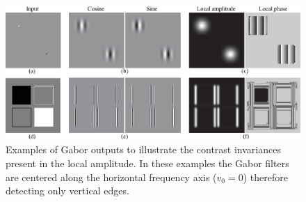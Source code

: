  


\begin{figure}[t]
\centerline{
\includegraphics[width=1\linewidth]{figures/spatial_filter_sets/gabor_quad_examples.eps} 
}
\caption{Examples of Gabor outputs to illustrate the contrast invariances present in the local amplitude. In these examples the Gabor filters are centered along the horizontal frequency axis ($v_0=0$) therefore detecting only vertical edges.} 
\label{fig:quad3}
\end{figure}




